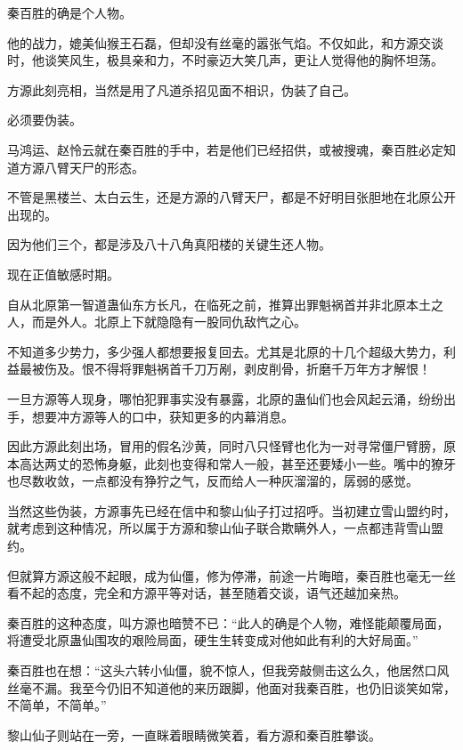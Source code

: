 
\begin{this_body}



秦百胜的确是个人物。

他的战力，媲美仙猴王石磊，但却没有丝毫的嚣张气焰。不仅如此，和方源交谈时，他谈笑风生，极具亲和力，不时豪迈大笑几声，更让人觉得他的胸怀坦荡。

方源此刻亮相，当然是用了凡道杀招见面不相识，伪装了自己。

必须要伪装。

马鸿运、赵怜云就在秦百胜的手中，若是他们已经招供，或被搜魂，秦百胜必定知道方源八臂天尸的形态。

不管是黑楼兰、太白云生，还是方源的八臂天尸，都是不好明目张胆地在北原公开出现的。

因为他们三个，都是涉及八十八角真阳楼的关键生还人物。

现在正值敏感时期。

自从北原第一智道蛊仙东方长凡，在临死之前，推算出罪魁祸首并非北原本土之人，而是外人。北原上下就隐隐有一股同仇敌忾之心。

不知道多少势力，多少强人都想要报复回去。尤其是北原的十几个超级大势力，利益最被伤及。恨不得将罪魁祸首千刀万剐，剥皮削骨，折磨千万年方才解恨！

一旦方源等人现身，哪怕犯罪事实没有暴露，北原的蛊仙们也会风起云涌，纷纷出手，想要冲方源等人的口中，获知更多的内幕消息。

因此方源此刻出场，冒用的假名沙黄，同时八只怪臂也化为一对寻常僵尸臂膀，原本高达两丈的恐怖身躯，此刻也变得和常人一般，甚至还要矮小一些。嘴中的獠牙也尽数收敛，一点都没有狰狞之气，反而给人一种灰溜溜的，孱弱的感觉。

当然这些伪装，方源事先已经在信中和黎山仙子打过招呼。当初建立雪山盟约时，就考虑到这种情况，所以属于方源和黎山仙子联合欺瞒外人，一点都违背雪山盟约。

但就算方源这般不起眼，成为仙僵，修为停滞，前途一片晦暗，秦百胜也毫无一丝看不起的态度，完全和方源平等对话，甚至随着交谈，语气还越加亲热。

秦百胜的这种态度，叫方源也暗赞不已：“此人的确是个人物，难怪能颠覆局面，将遭受北原蛊仙围攻的艰险局面，硬生生转变成对他如此有利的大好局面。”

秦百胜也在想：“这头六转小仙僵，貌不惊人，但我旁敲侧击这么久，他居然口风丝毫不漏。我至今仍旧不知道他的来历跟脚，他面对我秦百胜，也仍旧谈笑如常，不简单，不简单。”

黎山仙子则站在一旁，一直眯着眼睛微笑着，看方源和秦百胜攀谈。


\end{this_body}
